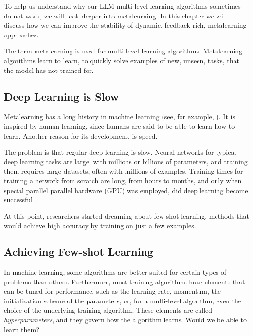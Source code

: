To help us understand why our LLM multi-level learning algorithms sometimes do not work, we will look deeper into metalearning. In this chapter we will discuss how we can improve the stability of  dynamic, feedback-rich,  metalearning approaches.



The term metalearning is used for multi-level learning algorithms. Metalearning algorithms learn to
learn, to quickly solve examples of new, unseen, tasks, that the model has not trained for.  
    
\subsection{Deep Learning is Slow}
Metalearning has a long history in machine learning (see, for example, \citet{schmidhuber1987evolutionary,hospedales2021meta,huisman2021survey}). It is inspired by human learning, since humans are said to be able to learn how to learn. Another reason for its development, is speed.

The problem is that regular deep learning is slow. Neural networks for typical deep learning tasks are large, with millions or billions of parameters, and training them requires large datasets, often with millions of examples. Training times for training a network from scratch are long, from hours to months, and only when special parallel parallel hardware (GPU) was employed, did deep learning become successful \citep{krizhevsky2012imagenet}.

At this point, researchers started dreaming about few-shot learning, methods that would achieve high accuracy by training on just a few examples. 

  
\subsection{Achieving Few-shot Learning}
In  machine learning, some algorithms are better suited for certain types of problems than others. Furthermore, most training algorithms have  elements that can be tuned for performance, such as the learning rate, momentum,  the initialization scheme of the parameters, or, for a multi-level algorithm, even the choice of the underlying training algorithm. These elements are called {\em hyperparameters}, and they govern how the algorithm learns.  Would we be able to learn them?

